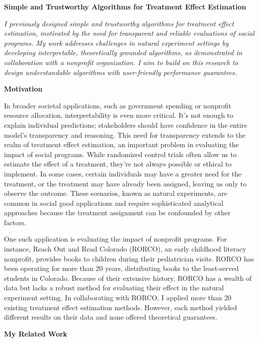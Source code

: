 \documentclass[11pt]{article}
\begin{document}
{\begin{center}
    { \large \textbf{Simple and Trustworthy Algorithms for Treatment Effect Estimation}}    
\end{center}

\textit{I previously designed simple and trustworthy algorithms for treatment effect estimation, motivated by the need for transparent and reliable evaluations of social programs. My work addresses challenges in natural experiment settings by developing interpretable, theoretically grounded algorithms, as demonstrated in collaboration with a nonprofit organization. I aim to build on this research to design understandable algorithms with user-friendly performance guarantees.}

{ \large \textbf{Motivation}}

In broader societal applications, such as government spending or nonprofit resource allocation, interpretability is even more critical. It's not enough to explain individual predictions; stakeholders should have confidence in the entire model's transparency and reasoning. This need for transparency extends to the realm of treatment effect estimation, an important problem in evaluating the impact of social programs. While randomized control trials often allow us to estimate the effect of a treatment, they're not always possible or ethical to implement. In some cases, certain individuals may have a greater need for the treatment, or the treatment may have already been assigned, leaving us only to observe the outcome. These scenarios, known as natural experiments, are common in social good applications and require sophisticated analytical approaches because the treatment assignment can be confounded by other factors.

One such application is evaluating the impact of nonprofit programs. For instance, Reach Out and Read Colorado (RORCO), an early childhood literacy nonprofit, provides books to children during their pediatrician visits. RORCO has been operating for more than 20 years, distributing books to the least-served students in Colorado. Because of their extensive history, RORCO has a wealth of data but lacks a robust method for evaluating their effect in the natural experiment setting. In collaborating with RORCO, I applied more than 20 existing treatment effect estimation methods. However, each method yielded different results on their data and none offered theoretical guarantees.

{ \large \textbf{My Related Work}}

}
\end{document}
